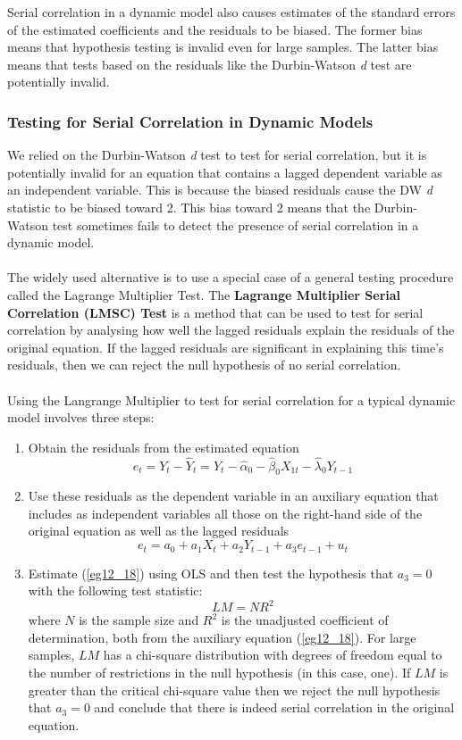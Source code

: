 \documentclass[11pt]{article}
\begin{document}
Serial correlation in a dynamic model also causes estimates of the standard errors of the estimated coefficients and the residuals to be biased. The former bias means that hypothesis testing is invalid even for large samples. The latter bias means that tests based on the residuals like the Durbin-Watson \textit{d} test are potentially invalid.
\subsubsection{Testing for Serial Correlation in Dynamic Models}
We relied on the Durbin-Watson \textit{d} test to test for serial correlation, but it is potentially invalid for an equation that contains a lagged dependent variable as an independent variable. This is because the biased residuals cause the DW \textit{d} statistic to be biased toward 2. This bias toward 2 means that the Durbin-Watson test sometimes fails to detect the presence of serial correlation in a dynamic model.\\ \\
The widely used alternative is to use a special case of a general testing procedure called the Lagrange Multiplier Test. The \textbf{Lagrange Multiplier Serial Correlation (LMSC) Test} is a method that can be used to test for serial correlation by analysing how well the lagged residuals explain the residuals of the original equation. If the lagged residuals are significant in explaining this time's residuals, then we can reject the null hypothesis of no serial correlation.\\ \\
Using the Langrange Multiplier to test for serial correlation for a typical dynamic model involves three steps:
\begin{enumerate}
\item Obtain the residuals from the estimated equation
\begin{equation}
e_t = Y_t - \hat{Y}_{t} = Y_t - \hat{\alpha}_0 - \hat{\beta}_0X_{1t} - \hat{\lambda}_0Y_{t-1} \label{eg12_17}
\end{equation}
\item Use these residuals as the dependent variable in an auxiliary equation that includes as independent variables all those on the right-hand side of the original equation as well as the lagged residuals
\begin{equation}
e_t = a_0 + a_1X_t + a_2Y_{t-1} + a_3e_{t-1} + u_t \label{eg12_18} 
\end{equation}
\item Estimate (\ref{eg12_18}) using OLS and then test the hypothesis that $a_3=0$ with the following test statistic:
\begin{equation}
LM = NR^2 \label{eg12_19}
\end{equation}
where $N$ is the sample size and $R^2$ is the unadjusted coefficient of determination, both from the auxiliary equation (\ref{eg12_18}). For large samples, $LM$ has a chi-square distribution with degrees of freedom equal to the number of restrictions in the null hypothesis (in this case, one). If $LM$ is greater than the critical chi-square value then we reject the null hypothesis that $a_3=0$ and conclude that there is indeed serial correlation in the original equation.
\end{enumerate}
\end{document}
